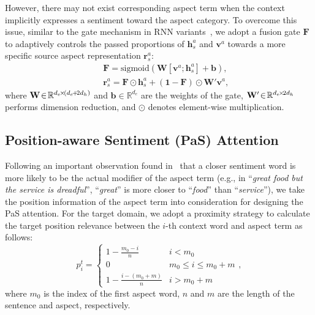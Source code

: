 \documentclass[letterpaper]{article} \usepackage{aaai19}  \usepackage{times}  \usepackage{latexsym}
\begin{document}
However, there may not exist corresponding aspect term when the context implicitly expresses a sentiment toward the aspect category. To overcome this issue, similar to the gate mechanism in RNN variants~\cite{jozefowicz2015empirical}, we adopt a fusion gate $\mathbf{F}$ to adaptively controls the passed proportions of ${ \mathbf{h} }^{ a}_{s}$ and ${\mathbf{v} }^{a}$ towards a more specific source aspect representation ${ \mathbf{r} }^{ a }_{s}$: 
\begin{eqnarray}
&&\mathbf{F}=\mathrm{sigmoid} ({ \mathbf{W} }[{ \mathbf{v} }^{ a }; { \mathbf{h} }_{s}^{a }]\!+\!{ \mathbf{ b} }), \\
&&{ \mathbf{r} }^{ a }_{s}=\mathbf{F}\odot { \mathbf{h} }_{s}^{ a}+(\mathbf{1}- \mathbf{F})\odot {\mathbf{W'}}{ \mathbf{v} }^{ a },
\end{eqnarray}
where $\small{{ \mathbf{W} }\!\in\! {\mathbb{R}}^{ { d }_{ e } \!\times\! ({ d }_{ e }\!+\!2{ d }_{ h })}}$ and ${{ \mathbf{b} }\!\in\! {\mathbb{R}}^{ { d }_{ e }} }$ are the weights of the gate, $\small{{\mathbf{W'}} \!\in\! \mathbb{R}^{ { d }_{ e } \!\times\! { 2d }_{ h }}}$ performs dimension reduction, and $\odot$ denotes element-wise multiplication.

\subsection{Position-aware Sentiment (PaS) Attention}
Following an important observation found in~\cite{tang2016aspect,chen2017recurrent} that a closer sentiment word is more likely to be the actual modifier of the aspect term (e.g., in ``{\it great food but the service is dreadful}'', ``{\it great}'' is more closer to ``{\it food}'' than ``{\it service}''), we take the position information of the aspect term into consideration for designing the PaS attention. For the target domain, we adopt a proximity strategy to calculate the target position relevance between the $i$-th context word and aspect term as follows:
\begin{equation}
{ p }^{ t }_{ i } = \left\{ \begin{array}{ll}
1-\frac { m_0-i }{ n }         & i<m_0\\
0                                       & m_0\le i\le m_0+m\\
1-\frac { i-(m_0+m) }{ n } & i>m_0+m
\end{array} \right.,
\end{equation}
where $m_0$ is  the index of the first aspect word, $n$ and $m$ are the length of the sentence and aspect, respectively. 
\end{document}
